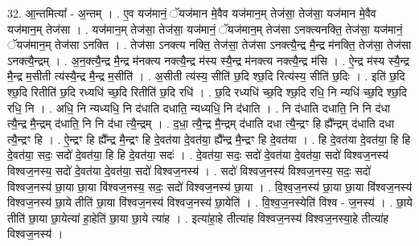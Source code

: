 \documentclass[17pt]{extarticle}
\begin{document}
32. आ॒न्तमित्या᳚ - अ॒न्तम् । . ए॒व यज॑मानं॒ ॅयज॑मान मे॒वैव यज॑मान॒म् तेज॑सा॒ तेज॑सा॒ यज॑मान मे॒वैव यज॑मान॒म् तेज॑सा । . यज॑मान॒म् तेज॑सा॒ तेज॑सा॒ यज॑मानं॒ ॅयज॑मान॒म् तेज॑सा ऽनक्त्यनक्ति॒ तेज॑सा॒ यज॑मानं॒ ॅयज॑मान॒म् तेज॑सा ऽनक्ति । . तेज॑सा ऽनक्त्य नक्ति॒ तेज॑सा॒ तेज॑सा ऽनक्त्यै॒न्द्र मै॒न्द्र म॑नक्ति॒ तेज॑सा॒ तेज॑सा ऽनक्त्यै॒न्द्रम् । . अ॒न॒क्त्यै॒न्द्र मै॒न्द्र म॑नक्त्य नक्त्यै॒न्द्र म॑स्य स्यै॒न्द्र म॑नक्त्य नक्त्यै॒न्द्र म॑सि । . ऐ॒न्द्र म॑स्य स्यै॒न्द्र मै॒न्द्र म॒सीती त्य॑स्यै॒न्द्र मै॒न्द्र म॒सीति॑ । . अ॒सीती त्य॑स्य॒ सीति॑ छ॒दि श्छ॒दि रित्य॑स्य॒ सीति॑ छ॒दिः । . इति॑ छ॒दि श्छ॒दि रितीति॑ छ॒दि रध्यधि॑ च्छ॒दि रितीति॑ छ॒दि रधि॑ । . छ॒दि रध्यधि॑ च्छ॒दि श्छ॒दि रधि॒ नि न्यधि॑ च्छ॒दि श्छ॒दि रधि॒ नि । . अधि॒ नि न्यध्यधि॒ नि द॑धाति दधाति॒ न्यध्यधि॒ नि द॑धाति । . नि द॑धाति दधाति॒ नि नि द॑धा त्यै॒न्द्र मै॒न्द्रम् द॑धाति॒ नि नि द॑धा त्यै॒न्द्रम् । . द॒धा॒ त्यै॒न्द्र मै॒न्द्रम् द॑धाति दधा त्यै॒न्द्रꣳ हि ह्यै᳚न्द्रम् द॑धाति दधा त्यै॒न्द्रꣳ हि । . ऐ॒न्द्रꣳ हि ह्यै᳚न्द्र मै॒न्द्रꣳ हि दे॒वत॑या दे॒वत॑या॒ ह्यै᳚न्द्र मै॒न्द्रꣳ हि दे॒वत॑या । . हि दे॒वत॑या दे॒वत॑या॒ हि हि दे॒वत॑या॒ सदः॒ सदो॑ दे॒वत॑या॒ हि हि दे॒वत॑या॒ सदः॑ । . दे॒वत॑या॒ सदः॒ सदो॑ दे॒वत॑या दे॒वत॑या॒ सदो॑ विश्वज॒नस्य॑ विश्वज॒नस्य॒ सदो॑ दे॒वत॑या दे॒वत॑या॒ सदो॑ विश्वज॒नस्य॑ । . सदो॑ विश्वज॒नस्य॑ विश्वज॒नस्य॒ सदः॒ सदो॑ विश्वज॒नस्य॑ छा॒या छा॒या वि॑श्वज॒नस्य॒ सदः॒ सदो॑ विश्वज॒नस्य॑ छा॒या । . वि॒श्व॒ज॒नस्य॑ छा॒या छा॒या वि॑श्वज॒नस्य॑ विश्वज॒नस्य॑ छा॒ये तीति॑ छा॒या वि॑श्वज॒नस्य॑ विश्वज॒नस्य॑ छा॒येति॑ । . वि॒श्व॒ज॒नस्येति॑ विश्व - ज॒नस्य॑ । . छा॒ये तीति॑ छा॒या छा॒येत्या॑ हा॒हेति॑ छा॒या छा॒ये त्या॑ह । . इत्या॑हा॒हे तीत्या॑ह विश्वज॒नस्य॑ विश्वज॒नस्या॒हे तीत्या॑ह विश्वज॒नस्य॑ । \newline
\end{document}
